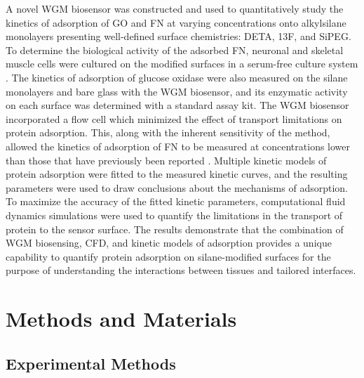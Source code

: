 A novel WGM biosensor was constructed and used to quantitatively study
the kinetics of adsorption of GO and FN at varying concentrations
onto alkylsilane monolayers presenting well-defined surface chemistries:
DETA, 13F, and SiPEG. To determine the biological activity of the
adsorbed FN, neuronal and skeletal muscle cells were cultured on the
modified surfaces in a serum-free culture system \cite{Brewer1995,Das2007}.
The kinetics of adsorption of glucose oxidase were also measured on
the silane monolayers and bare glass with the WGM biosensor, and its
enzymatic activity on each surface was determined with a standard
assay kit. The WGM biosensor incorporated a flow cell which minimized
the effect of transport limitations on protein adsorption. This, along
with the inherent sensitivity of the method, allowed the kinetics
of adsorption of FN to be measured at concentrations lower than those
that have previously been reported \cite{Michael2003}. Multiple kinetic
models of protein adsorption were fitted to the measured kinetic curves,
and the resulting parameters were used to draw conclusions about the
mechanisms of adsorption. To maximize the accuracy of the fitted kinetic
parameters, computational fluid dynamics simulations were used to
quantify the limitations in the transport of protein to the sensor
surface. The results demonstrate that the combination of WGM biosensing,
CFD, and kinetic models of adsorption provides a unique capability
to quantify protein adsorption on silane-modified surfaces for the
purpose of understanding the interactions between tissues and tailored
interfaces.


\section{Methods and Materials}


\subsection{Experimental Methods}

